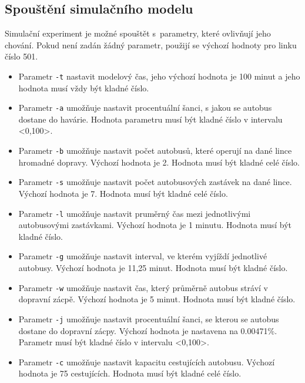\documentclass[a4paper]{article}
\begin{document}
        \subsection{Spouštění simulačního modelu}
        \label{subsec:start}

            Simulační experiment je možné spouštět s~parametry, které ovlivňují jeho chování. Pokud není zadán žádný parametr, použijí se výchozí hodnoty pro linku číslo 501.
            
            \begin{itemize}
                \item Parametr \texttt{-t}  nastavit modelový čas, jeho výchozí hodnota je 100 minut a jeho hodnota musí vždy být kladné číslo.
                \item Parametr \texttt{-a} umožňuje nastavit procentuální šanci, s jakou se autobus dostane do havárie. Hodnota parametru musí být kladné číslo v intervalu <0,100>.
                \item Parametr \texttt{-b} umožňuje nastavit počet autobusů, které operují na dané lince hromadné dopravy. Výchozí hodnota je 2. Hodnota musí být kladné celé číslo.
                \item Parametr \texttt{-s} umožňuje nastavit počet autobusových zastávek na dané lince. Výchozí hodnota je 7. Hodnota musí být kladné celé číslo.
                \item Parametr \texttt{-l} umožňuje nastavit pruměrný čas mezi jednotlivými autobusovými zastávkami. Výchozí hodnota je 1 minutu. Hodnota musí být kladné číslo.
                \item Parametr \texttt{-g} umožňuje nastavit interval, ve kterém vyjíždí jednotlivé autobusy. Výchozí hodnota je 11,25 minut. Hodnota musí být kladné číslo.
                \item Parametr \texttt{-w} umožňuje nastavit čas, který průměrně autobus stráví v dopravní zácpě. Výchozí hodnota je 5 minut. Hodnota musí být kladné číslo.
                \item Parametr \texttt{-j} umožňuje nastavit procentuální šanci, se kterou se autobus dostane do dopravní zácpy. Výchozí hodnota je nastavena na 0.00471\%. Parametr musí být kladné číslo v intervalu <0,100>.
                \item Parametr \texttt{-c} umožňuje nastavit kapacitu cestujících autobusu. Výchozí hodnota je 75 cestujících. Hodnota musí být kladné  celé číslo.
            

\end{itemize}
\end{document}
